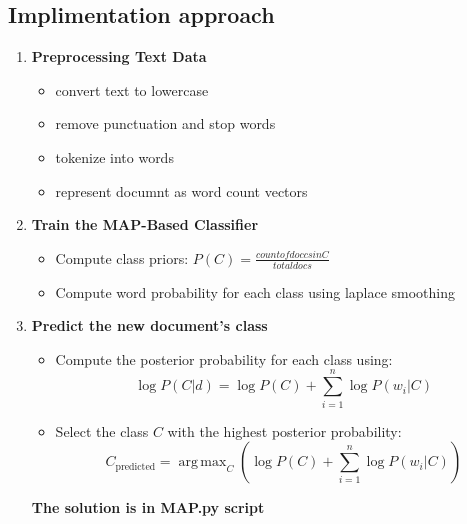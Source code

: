 \documentclass{article}
\DeclareMathOperator*{\argmax}{arg\,max}
\begin{document}
\subsection*{Implimentation approach}
\begin{enumerate}
    \item \textbf{Preprocessing Text Data}
    \begin{itemize}
        \item convert text to lowercase
        \item remove punctuation and stop words
        \item tokenize into words
        \item represent documnt as word count vectors
    \end{itemize}
    \item \textbf{Train the MAP-Based Classifier}
    \begin{itemize}
        \item Compute class priors: \(P(C) = \frac{count of doccs in C}{total docs}\)
        \item Compute word probability for each class using laplace smoothing
    \end{itemize}
    \item \textbf{Predict the new document's class}
    \begin{itemize}
        \item Compute the posterior probability for each class using:
        \[
        \log P(C|d) = \log P(C) + \sum_{i=1}^{n} \log P(w_i|C)
        \]
        \item Select the class \(C\) with the highest posterior probability:
        \[
        C_{\text{predicted}} = \argmax_C \left( \log P(C) + \sum_{i=1}^{n} \log P(w_i|C) \right)
        \]
    \end{itemize}
    \textbf{The solution is in MAP.py script}
\end{enumerate}
\end{document}
